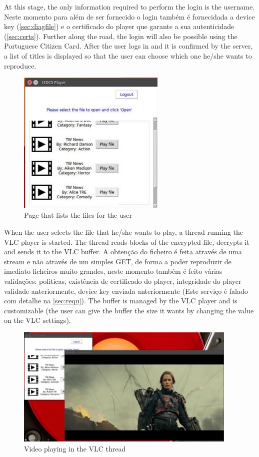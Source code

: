\documentclass[11pt,a4paper]{report}
\begin{document}
At this stage, the only information required to perform the login is the username. Neste momento para além de ser fornecido o login também é fornecidada a device key (\autoref{sec:diagfile}) e o certificado do player que garante a sua autenticidade (\autoref{sec:certs}).
Further along the road, the login will also be possible using the Portuguese Citizen Card.
\newline After the user logs in and it is confirmed by the server, a list of titles is displayed so that the user can choose which one he/she wants to reproduce.

\begin{figure}[H]
\centerline{\includegraphics[width=200pt]{images/playerList.jpg}}
\caption{Page that lists the files for the user}
\label{player}
\end{figure}

When the user selects the file that he/she wants to play, a thread running the VLC player is started. The thread reads blocks of the encrypted file, decrypts it and sends it to the VLC buffer.
A obtenção do ficheiro é feita através de uma stream e não através de um simples GET, de forma a poder reproduzir de imediato ficheiros muito grandes, neste momento também é feito várias validações: politicas, existência de certificado do player, integridade do player validade anteriormente, device key enviada anteriormente (Este serviço é falado com detalhe na \autoref{sec:requ}).
\newline
The buffer is managed by the VLC player and is customizable (the user can give the buffer the size it wants by changing the value on the VLC settings).

\begin{figure}[H]
\centerline{\includegraphics[width=300pt]{images/playerPlay.jpg}}
\caption{Video playing in the VLC thread}
\label{player}
\end{figure}
\end{document}
